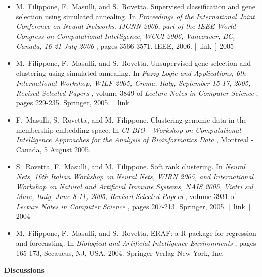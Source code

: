 \documentclass[10pt]{article}
\begin{document}
\begin{itemize}
\item 

  M. Filippone, F. Masulli, and S. Rovetta. Supervised classification and gene selection using simulated annealing. In \emph{Proceedings of the International Joint Conference on Neural Networks, IJCNN 2006, part of the IEEE World Congress on Computational Intelligence, WCCI 2006, Vancouver, BC, Canada, 16-21 July 2006}
, pages 3566-3571. IEEE, 2006. [ link ] 
2005
\item 

  M. Filippone, F. Masulli, and S. Rovetta. Unsupervised gene selection and clustering using simulated annealing. In \emph{Fuzzy Logic and Applications, 6th International Workshop, WILF 2005, Crema, Italy, September 15-17, 2005, Revised Selected Papers}
, volume 3849 of \emph{Lecture Notes in Computer Science}
, pages 229-235. Springer, 2005. [ link ] 

\item 

  F. Masulli, S. Rovetta, and M. Filippone. Clustering genomic data in the membership embedding space. In \emph{CI-BIO - Workshop on Computational Intelligence Approaches for the Analysis of Bioinformatics Data}
, Montreal - Canada, 5 August 2005. 

\item 

  S. Rovetta, F. Masulli, and M. Filippone. Soft rank clustering. In \emph{Neural Nets, 16th Italian Workshop on Neural Nets, WIRN 2005, and International Workshop on Natural and Artificial Immune Systems, NAIS 2005, Vietri sul Mare, Italy, June 8-11, 2005, Revised Selected Papers}
, volume 3931 of \emph{Lecture Notes in Computer Science}
, pages 207-213. Springer, 2005. [ link ] 
2004
\item 

  M. Filippone, F. Masulli, and S. Rovetta. ERAF: a R package for regression and forecasting. In \emph{Biological and Artificial Intelligence Environments}
, pages 165-173, Secaucus, NJ, USA, 2004. Springer-Verlag New York, Inc. 


\end{itemize}
\textbf{Discussions}
\end{document}

